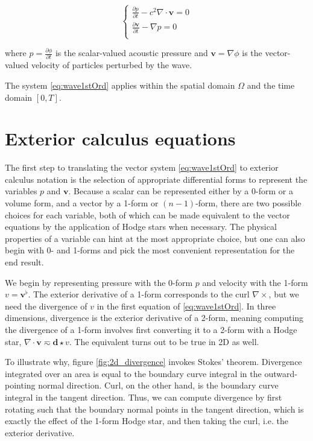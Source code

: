 \documentclass[utf8,english]{gradu3}
\begin{document}
\begin{equation}\label{eq:wave1stOrd}
  \begin{cases}
    \frac{\partial p}{\partial t} - c^2\nabla \cdot \mathbf{v} = 0 \\
    \frac{\partial \mathbf{v}}{\partial t} - \nabla p = 0 \\
  \end{cases}
\end{equation}

where $p = \frac{\partial \phi}{\partial t}$ is the scalar-valued acoustic pressure
and $\mathbf{v} = \nabla \phi$ is the vector-valued velocity
of particles perturbed by the wave.

The system \eqref{eq:wave1stOrd} applies within the spatial domain $\Omega$
and the time domain $[0, T]$.


\section{Exterior calculus equations}

The first step to translating the vector system \eqref{eq:wave1stOrd}
to exterior calculus notation is the selection of appropriate differential forms
to represent the variables $p$ and $\mathbf{v}$.
Because a scalar can be represented either by a 0-form or a volume form,
and a vector by a 1-form or $(n-1)$-form,
there are two possible choices for each variable,
both of which can be made equivalent to the vector equations
by the application of Hodge stars when necessary.
The physical properties of a variable can hint at the most appropriate choice,
but one can also begin with 0- and 1-forms
and pick the most convenient representation for the end result.

We begin by representing pressure with the 0-form $p$
and velocity with the 1-form $v = \mathbf{v}^{\flat}$.
The exterior derivative of a 1-form corresponds to the curl $\nabla \times$,
but we need the divergence of $v$ in the first equation of \eqref{eq:wave1stOrd}.
In three dimensions, divergence is the exterior derivative of a 2-form,
meaning computing the divergence of a 1-form involves first converting
it to a 2-form with a Hodge star, $\nabla \cdot \mathbf{v} \eqsim \mathbf{d}\star v$.
The equivalent turns out to be true in 2D as well.

To illustrate why, figure \ref{fig:2d_divergence} invokes Stokes' theorem.
Divergence integrated over an area is equal to the boundary curve integral
in the outward-pointing normal direction.
Curl, on the other hand, is the boundary curve integral in the tangent direction.
Thus, we can compute divergence by first rotating such that the boundary normal
points in the tangent direction, which is exactly the effect of the 1-form Hodge star,
and then taking the curl, i.e. the exterior derivative.
\end{document}

